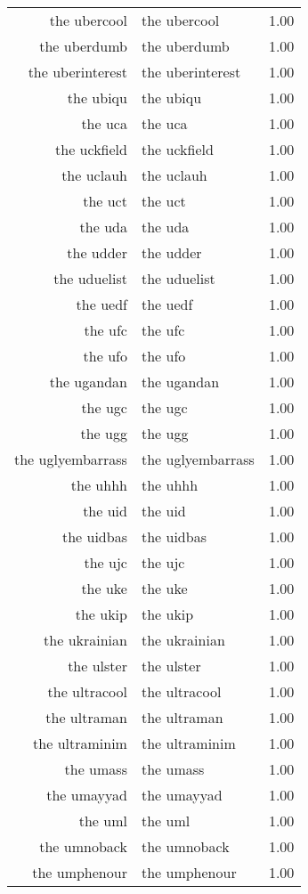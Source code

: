 \begin{table}[ht]
\begin{tabular}{rlr}
  the ubercool & the ubercool & 1.00 \\ 
  the uberdumb & the uberdumb & 1.00 \\ 
  the uberinterest & the uberinterest & 1.00 \\ 
  the ubiqu & the ubiqu & 1.00 \\ 
  the uca & the uca & 1.00 \\ 
  the uckfield & the uckfield & 1.00 \\ 
  the uclauh & the uclauh & 1.00 \\ 
  the uct & the uct & 1.00 \\ 
  the uda & the uda & 1.00 \\ 
  the udder & the udder & 1.00 \\ 
  the uduelist & the uduelist & 1.00 \\ 
  the uedf & the uedf & 1.00 \\ 
  the ufc & the ufc & 1.00 \\ 
  the ufo & the ufo & 1.00 \\ 
  the ugandan & the ugandan & 1.00 \\ 
  the ugc & the ugc & 1.00 \\ 
  the ugg & the ugg & 1.00 \\ 
  the uglyembarrass & the uglyembarrass & 1.00 \\ 
  the uhhh & the uhhh & 1.00 \\ 
  the uid & the uid & 1.00 \\ 
  the uidbas & the uidbas & 1.00 \\ 
  the ujc & the ujc & 1.00 \\ 
  the uke & the uke & 1.00 \\ 
  the ukip & the ukip & 1.00 \\ 
  the ukrainian & the ukrainian & 1.00 \\ 
  the ulster & the ulster & 1.00 \\ 
  the ultracool & the ultracool & 1.00 \\ 
  the ultraman & the ultraman & 1.00 \\ 
  the ultraminim & the ultraminim & 1.00 \\ 
  the umass & the umass & 1.00 \\ 
  the umayyad & the umayyad & 1.00 \\ 
  the uml & the uml & 1.00 \\ 
  the umnoback & the umnoback & 1.00 \\ 
  the umphenour & the umphenour & 1.00 \\ 

\end{tabular}
\end{table}
